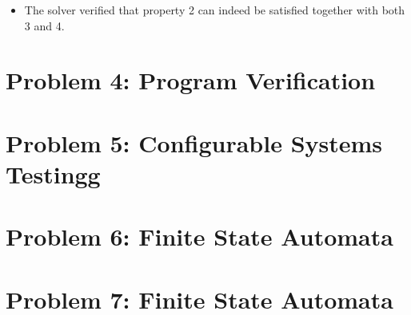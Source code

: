 \documentclass{article}
\begin{document}
\begin{itemize}
    \item The solver verified that property 2 can indeed be satisfied together with both 3 and 4.
\end{itemize}

\vspace{1em}
\section*{Problem 4: Program Verification }
\setcounter{section}{0}

\vspace{1em}
\section*{Problem 5: Configurable Systems Testingg}
\setcounter{section}{0}

\vspace{1em}
\section*{Problem 6: Finite State Automata}
\setcounter{section}{0}

\vspace{1em}
\section*{Problem 7: Finite State Automata}
\setcounter{section}{0}
\end{document}
